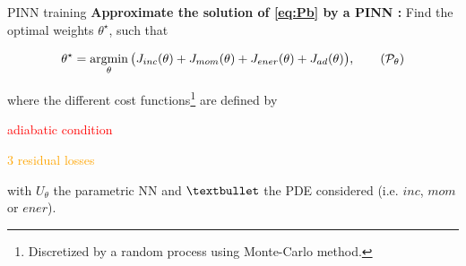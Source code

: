 \begin{frame}{PINN training}
    \vspace{-4pt}
    \textbf{Approximate the solution of \eqref{eq:Pb} by a PINN :} Find the optimal weights $\theta^\star$, such that
	
    \vspace{-8pt}
    \begin{equation}
		\label{eq:opt_pb}
		\theta^\star = \argmin_{\theta}	\big( J_{inc}(\theta) + J_{mom}(\theta) + J_{ener}(\theta) + J_{ad}(\theta) \big),
		\tag{$\mathcal{P}_\theta$}
	\end{equation}

    \vspace{-2pt}
	where the different cost functions\footnote[frame,1]{Discretized by a random process using Monte-Carlo method.} are defined by
	\vspace{5pt}

	\begin{minipage}{0.24\linewidth}
		\centering
		\textcolor{red}{adiabatic condition}
        
		\vspace{12pt}
		\textcolor{orange}{$3$ residual losses}
	\end{minipage}
	\begin{minipage}{0.68\linewidth}
		\centering
        
        \vspace{3pt}
	\end{minipage}
    
    \vspace{5pt}
    with $U_\theta$ the parametric NN and $\textbullet$ the PDE considered (i.e. $inc$, $mom$ or $ener$).

    

\end{frame}
